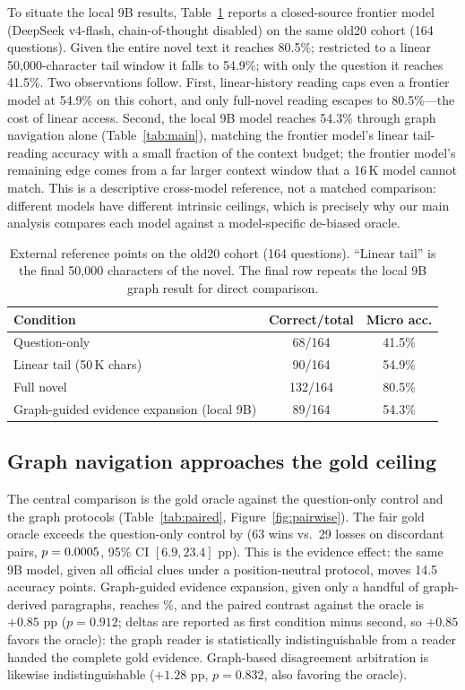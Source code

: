 \documentclass{article}
\newcommand{\pp}{\ensuremath{\,\mathrm{pp}}}
\begin{document}
To situate the local 9B results, Table~\ref{tab:closed} reports a closed-source
frontier model (DeepSeek v4-flash, chain-of-thought disabled) on the same old20
cohort (164 questions). Given the entire novel text it reaches 80.5\%;
restricted to a linear 50{,}000-character tail window it falls to 54.9\%; with
only the question it reaches 41.5\%. Two observations follow. First,
linear-history reading caps even a frontier model at 54.9\% on this cohort, and
only full-novel reading escapes to 80.5\%---the cost of linear access. Second,
the local 9B model reaches 54.3\% through graph navigation alone
(Table~\ref{tab:main}), matching the frontier model's linear tail-reading
accuracy with a small fraction of the context budget; the frontier model's
remaining edge comes from a far larger context window that a 16\,K model cannot
match. This is a descriptive cross-model reference, not a matched comparison:
different models have different intrinsic ceilings, which is precisely why our
main analysis compares each model against a model-specific de-biased oracle.

\begin{table}[t]
\centering
\caption{
External reference points on the old20 cohort (164 questions). ``Linear tail'' is
the final 50{,}000 characters of the novel. The final row repeats the local 9B
graph result for direct comparison.
}
\label{tab:closed}
\begin{tabular}{lcc}
\toprule
Condition & Correct/total & Micro acc. \\
\midrule
Question-only & 68/164 & 41.5\% \\
Linear tail (50\,K chars) & 90/164 & 54.9\% \\
Full novel & 132/164 & 80.5\% \\
\midrule
Graph-guided evidence expansion (local 9B) & 89/164 & 54.3\% \\
\bottomrule
\end{tabular}
\end{table}

\subsection{Graph navigation approaches the gold ceiling}
\label{sec:goldceiling}

The central comparison is the gold oracle against the question-only control and
the graph protocols (Table~\ref{tab:paired}, Figure~\ref{fig:pairwise}).
The fair gold oracle exceeds the question-only control by
\GoldVsTerseDelta{} (63 wins vs.\ 29 losses on discordant pairs,
$p=0.0005{}$, 95\% CI $[6.9, 23.4]$\,\pp). This is the evidence effect: the
same 9B model, given all official clues under a position-neutral protocol,
moves 14.5 accuracy points. Graph-guided evidence expansion, given only a
handful of graph-derived paragraphs, reaches \GraphExpansionAcc\%, and the
paired contrast against the oracle is $+0.85$\,\pp{} ($p=0.912$; deltas are
reported as first condition minus second, so $+0.85$ favors the oracle): the
graph reader is statistically indistinguishable from a reader handed the
complete gold evidence. Graph-based disagreement arbitration is likewise
indistinguishable ($+1.28$\,\pp, $p=0.832$, also favoring the oracle).
\end{document}
